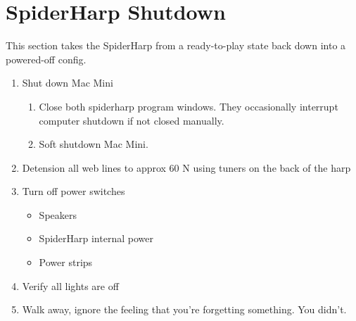 \documentclass{ol-softwaremanual}
\begin{document}
\newpage

\section{SpiderHarp Shutdown}

This section takes the SpiderHarp from a ready-to-play state back down into a powered-off config.

\begin{enumerate}
    \item Shut down Mac Mini
    \begin{enumerate}
        \item Close both spiderharp program windows.  They occasionally interrupt computer shutdown if not closed manually.
        \item Soft shutdown Mac Mini.
    \end{enumerate}
    \item Detension all web lines to approx 60 N using tuners on the back of the harp
    \item Turn off power switches
    \begin{itemize}
        \item Speakers
        \item SpiderHarp internal power
        \item Power strips
    \end{itemize}
    \item Verify all lights are off
    \item Walk away, ignore the feeling that you're forgetting something.  You didn't.
\end{enumerate}
\end{document}
